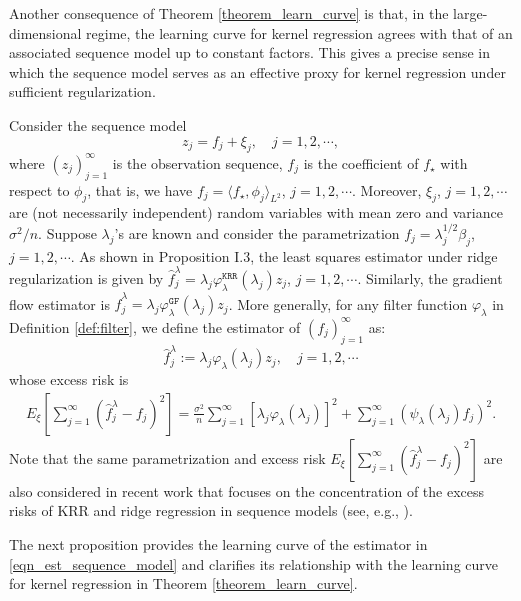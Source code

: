 \documentclass{article}
\theoremstyle{plain}
\theoremstyle{definition}
\theoremstyle{remark}
\newcommand{\reg}{\varphi_\lambda}
\newcommand{\rem}{\psi_\lambda}
\newcommand*{\gf}{\mathtt{GF}}
\newcommand*{\krr}{\mathtt{KRR}}
\begin{document}
Another consequence of Theorem \ref{theorem_learn_curve} is that, in the large-dimensional regime, the learning curve for kernel regression agrees with that of an associated sequence model up to constant factors. This gives a precise sense in which the sequence model serves as an effective proxy for kernel regression under sufficient regularization.

Consider the sequence model
\begin{equation}\label{eqn_sequence_model}
    z_j = f_j + \xi_j,\quad j=1, 2, \cdots,
\end{equation}
where $(z_j)_{j=1}^{\infty}$ is the observation sequence, $f_j$ is the coefficient of $f_{\star}$ with respect to $\phi_j$, that is, we have $f_j = \langle f_{\star}, \phi_j \rangle_{L^2}$, $j=1, 2, \cdots$. Moreover, $\xi_j$, $j=1, 2, \cdots$ are (not necessarily independent) random variables with mean zero and variance $\sigma^2 / n$.
Suppose $\lambda_j$'s are known and consider the parametrization $f_j = \lambda_j^{1/2} \beta_j$, $j=1, 2, \cdots$. 
As shown in Proposition I.3, 
the least squares estimator under ridge regularization is given by $\hat{f}_j^{\lambda} = \lambda_j \reg^{\krr}(\lambda_j) z_j$, $j=1, 2, \cdots$. 
Similarly, the gradient flow estimator is $\hat{f}_j^{\lambda} = \lambda_j \reg^{\gf}(\lambda_j) z_j$. 
More generally, for any filter function $\reg$ in Definition \ref{def:filter},
we define the estimator of $(f_j)_{j=1}^{\infty}$ as:
\begin{equation}\label{eqn_est_sequence_model}
    \hat{f}_j^{\lambda} := \lambda_j \reg(\lambda_j) z_j,\quad j=1, 2, \cdots
\end{equation}
whose excess risk is
\begin{equation}\label{eqn_excess_risk_sequence}
    \begin{aligned}
        E_{\xi}\left[\sum_{j=1}^{\infty}(\hat{f}_j^{\lambda} - f_j)^2\right]
        =
        \frac{\sigma^2}{n}\sum_{j =1}^\infty \left[ \lambda_j \reg(\lambda_j) \right]^2
        + \sum\limits_{j=1}^{\infty} \left( \rem(\lambda_j) f_{j}\right)^{2}.
    \end{aligned}
\end{equation}
Note that the same parametrization and excess risk $E_{\xi}\left[\sum_{j=1}^{\infty}(\hat{f}_j^{\lambda} - f_j)^2\right]$ are also considered in recent work that focuses on the concentration of the excess risks of KRR and ridge regression in sequence models (see, e.g., \cite{cheng2022dimension, misiakiewicz2024non}). 


The next proposition provides the learning curve of the estimator in \eqref{eqn_est_sequence_model} and clarifies its relationship with the learning curve for kernel regression in Theorem \ref{theorem_learn_curve}.
\end{document}
